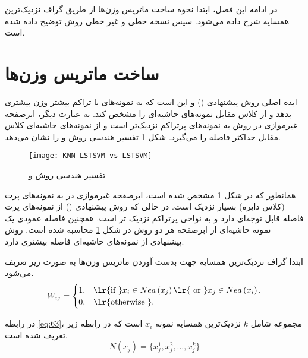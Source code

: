 در ادامه این فصل، ابتدا نحوه ساخت ماتریس وزن‌ها از طریق گراف  نزدیک‌ترین همسایه شرح داده می‌شود. سپس نسخه خطی و غیر خطی روش  توضیح داده شده است.

\section{ساخت ماتریس وزن‌ها}\label{sec:3:2}
ایده اصلی روش پیشنهادی () و  این است که به نمونه‌های با تراکم بیشتر وزن بیشتری بدهد و از کلاس مقابل نمونه‌های حاشیه‌ای را مشخص کند. به عبارت دیگر، ابرصفحه غیرموازی در روش  به نمونه‌های پرتراکم نزدیک‌تر است و از نمونه‌های حاشیه‌ای کلاس مقابل حداکثر فاصله را می‌گیرد. شکل \ref{fig:KNN-LSTSVM-LSTSVM} تفسیر هندسی روش  و  را نشان می‌دهد.

\begin{figure}[!b]
	\centering
	\texttt{[image: KNN-LSTSVM-vs-LSTSVM]}
	\caption{ تفسیر هندسی روش  و }
	\label{fig:KNN-LSTSVM-LSTSVM}
\end{figure}

همانطور که در شکل \ref{fig:KNN-LSTSVM-LSTSVM} مشخص شده است، ابرصفحه غیرموازی در  به نمونه‌های پرت (کلاس دایره) بسیار نزدیک است. در حالی که روش پیشنهادی () از نمونه‌های پرت فاصله قابل توجه‌ای دارد و به نواحی پرتراکم نزدیک تر است. همچنین فاصله عمودی یک نمونه حاشیه‌ای از ابرصفحه هر دو روش در شکل ‏\ref{fig:KNN-LSTSVM-LSTSVM} محاسبه شده است. روش پیشنهادی از نمونه‌های حاشیه‌ای فاصله بیشتری دارد.

ابتدا گراف  نزدیک‌ترین همسایه جهت بدست آوردن ماتریس وزن‌ها به صورت زیر تعریف می‌شود.
\begin{equation}\label{eq:63}
W_{ij} =
\begin{cases}
1, & \textrm{\lr{if }} x_i \in Nea\left(x_j\right)\textrm{\lr{ or }} x_j \in Nea\left(x_i\right),  \\
0, & \textrm{\lr{otherwise }}.
\end{cases}
\end{equation}

در رابطه \ref{eq:63}، مجموعه  شامل $k$ نزدیک‌ترین همسایه نمونه  $x_i$ است که در رابطه زیر تعریف شده است.
\begin{equation}\label{eq:64}
N(x_j) = \{x^1_j, x^2_j, \dots , x^k_j\}
\end{equation}

